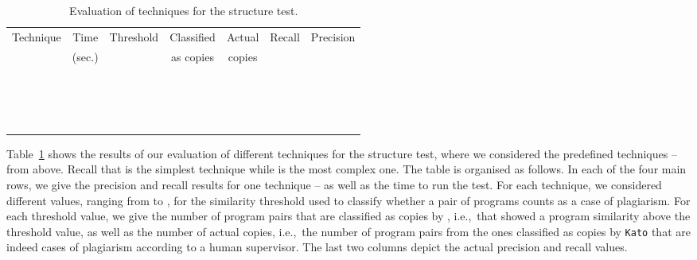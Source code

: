 \documentclass{tlp}
\newcommand{\iec}[0]{i.e.,\ }
\newcommand{\kato}[0]{\texttt{Kato}\xspace}
\begin{document}
\begin{table}
	\caption{Evaluation of techniques for the structure test.}
	\label{tab:eval}
{\footnotesize
	\begin{center}
	\begin{tabular}{ccccccc}
	  \hline
	  	     {Technique} & 
	  	     {Time} & 
	  	    {Threshold} & 
	  	    {Classified} & 
	  	    {Actual} & 
	  	    {Recall} & 
	  	    {Precision} \\
	    & (sec.) & & as copies & copies & & \\
	    \toprule
	  \multirow{4}{*}{ } & \multirow{4}{*}{ } &  &  &  &  &   \\ 
	  &  &  &  &  &  &  \\ 
	  &  &  &  &  &  &  \\ 
	  &  &  &  &  &  &  \\ 
	\midrule
	  \multirow{4}{*}{ } & \multirow{4}{*}{ } &  &  &  &  &  \\ 
	  &  &  &  &  &  &  \\ 
	  &  &  &  &  &  &  \\ 
	  &  &  &  &  &  &  \\ 
	\midrule
	  \multirow{4}{*}{ } & \multirow{4}{*}{ } &  &  &  &  &  \\ 
	  &  &  &  &  &  &  \\ 
	  &  &  &  &  &  &  \\ 
	  &  &  &  &  &  &  \\ 
	\midrule
	  \multirow{4}{*}{ } & \multirow{4}{*}{ } &  &  &  &  &  \\ 
	  &  &  &  &  &  &  \\ 
	  &  &  &  &  &  &  \\ 
	  &  &  &  &  &  &   \\ 
	  \bottomrule
	\end{tabular}
	\end{center}
}
\vspace{-1\baselineskip}
\end{table}

Table~\ref{tab:eval} shows the results of our evaluation of different techniques for the structure test, where
we considered the predefined techniques -- from above. Recall that  is the simplest technique while  is the most
complex one.
The table is organised as follows.
In each of the four main rows, we give the precision and recall results for one technique -- as well as the time to run the test.
For each technique, we considered different values, ranging from  to ,  for the similarity threshold used to
classify whether a pair of programs counts as a case of plagiarism.
For each threshold value, we give the number of program pairs that are classified as copies by , \iec that showed a program
similarity above the threshold value, as well as the number of actual copies, \iec the number of program pairs from the ones classified
 as copies by \kato that are indeed cases of plagiarism according to a human supervisor.
The last two columns depict the actual precision and recall values.
\end{document}

